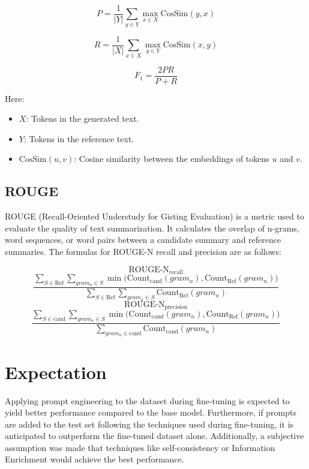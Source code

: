 \documentclass[11pt]{article}
\begin{document}
\[
P = \frac{1}{|Y|} \sum_{y \in Y} \max_{x \in X} \text{CosSim}(y, x)
\]

\[
R = \frac{1}{|X|} \sum_{x \in X} \max_{y \in Y} \text{CosSim}(x, y)
\]

\[
F_1 = \frac{2PR}{P + R}
\]

Here:
\begin{itemize}
    \item $X$: Tokens in the generated text.
    \item $Y$: Tokens in the reference text.
    \item $\text{CosSim}(u, v)$: Cosine similarity between the embeddings of tokens $u$ and $v$.
\end{itemize}

\subsection{ROUGE}

ROUGE (Recall-Oriented Understudy for Gisting Evaluation) is a metric used to evaluate the quality of text summarization. It calculates the overlap of n-grams, word sequences, or word pairs between a candidate summary and reference summaries. The formulas for ROUGE-N recall and precision are as follows:

\small %
\[
\text{ROUGE-N}_{\text{recall}}
\]
\[
\frac{
\sum_{S \in \text{Ref}} \sum_{gram_n \in S} 
\min\big(\text{Count}_{\text{cand}}(gram_n), \text{Count}_{\text{Ref}}(gram_n)\big)
}{
\sum_{S \in \text{Ref}} \sum_{gram_n \in S} 
\text{Count}_{\text{Ref}}(gram_n)
}
\]
\vspace{2em}
\[
\text{ROUGE-N}_{\text{precision}}
\]
\[
\frac{
\sum_{S \in \text{cand}} \sum_{gram_n \in S} 
\min\big(\text{Count}_{\text{cand}}(gram_n), \text{Count}_{\text{Ref}}(gram_n)\big)
}{
\sum_{gram_n \in \text{cand}} 
\text{Count}_{\text{cand}}(gram_n)
}
\]
\normalsize %

\section{Expectation}
Applying prompt engineering to the dataset during fine-tuning is expected to yield better performance compared to the base model. Furthermore, if prompts are added to the test set following the techniques used during fine-tuning, it is anticipated to outperform the fine-tuned dataset alone. Additionally, a subjective assumption was made that techniques like self-consistency or Information Enrichment would achieve the best performance.
\end{document}
